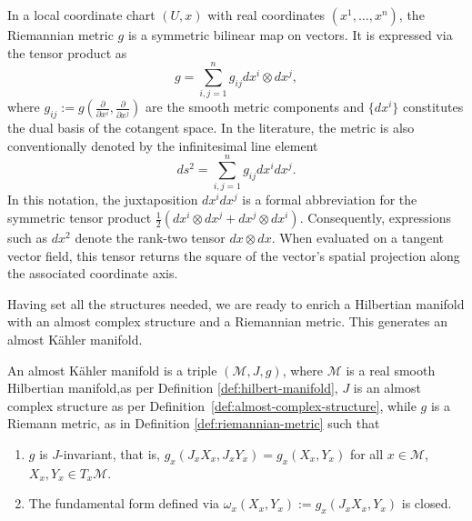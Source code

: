 \begin{remark}
	\label{rem:metric-coordinates}
	In a local coordinate chart $(U, x)$ with real coordinates $(x^1, \dots, x^n)$, the Riemannian metric $g$ is a symmetric bilinear map on vectors. It is expressed via the tensor product as
	\begin{equation}
		g = \sum_{i,j=1}^n g_{ij} dx^i \otimes dx^j,
	\end{equation}
	where $g_{ij} := g\left(\frac{\partial}{\partial x^i}, \frac{\partial}{\partial x^j}\right)$ are the smooth metric components and $\{dx^i\}$ constitutes the dual basis of the cotangent space. In the literature, the metric is also conventionally denoted by the infinitesimal line element
	\begin{equation}
		ds^2 = \sum_{i,j=1}^n g_{ij} dx^i dx^j.
	\end{equation}
	In this notation, the juxtaposition $dx^i dx^j$ is a formal abbreviation for the symmetric tensor product $\frac{1}{2}(dx^i \otimes dx^j + dx^j \otimes dx^i)$. Consequently, expressions such as $dx^2$ denote the rank-two tensor $dx \otimes dx$. When evaluated on a tangent vector field, this tensor returns the square of the vector's spatial projection along the associated coordinate axis.
\end{remark}

Having set all the structures needed, we are ready to enrich a Hilbertian manifold with an almost complex structure and a Riemannian metric. This generates an almost Kähler manifold.

\begin{definition}
	\label{def:almost-kahler-manifold}
	An almost Kähler manifold is a triple $(\mathcal{M},J,g)$, where $\mathcal{M}$ is a real
	smooth Hilbertian manifold,as per Definition \ref{def:hilbert-manifold}, $J$ is an almost complex structure as per Definition~\ref{def:almost-complex-structure}, while $g$ is a Riemann metric, as in Definition \ref{def:riemannian-metric} such that
	\begin{enumerate}[label=(\roman*)]
		\item $g$ is $J$-invariant, that is, $g_x(J_xX_x,J_xY_x)=g_x(X_x,Y_x)$ for all $x\in\mathcal{M}$, $X_x,Y_x\in T_x\mathcal{M}$.
		\item The fundamental form defined via $\omega_x(X_x,Y_x):=g_x(J_xX_x,Y_x)$ is closed.
	\end{enumerate}
\end{definition}

